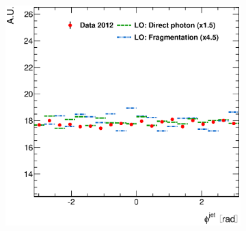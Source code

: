 \documentclass[12pt, twoside]{article}
\numberwithin{equation}{section}
\numberwithin{figure}{section}
\newenvironment{changemargin}[2]{%
\begin{list}{}{%
\setlength{\topsep}{0pt}%
\setlength{\leftmargin}{#1}%
\setlength{\rightmargin}{#2}%
\setlength{\listparindent}{\parindent}%
\setlength{\itemindent}{\parindent}%
\setlength{\parsep}{\parskip}%
}%
\item[]}{\end{list}}
\begin{document}
\begin{figure}
\begin{changemargin}{-1.0cm}{-0.75cm}
\begin{changemargin}{-0.75cm}{-1.0cm}
\begin{subfigure}[b]{0.37\textwidth}
            \subcaption{}
            \label{fig:DiffCrossSectDPFPRapidityJet}
        \end{subfigure}
        \begin{subfigure}[b]{0.37\textwidth}
            \includegraphics[width=\textwidth]{./images/DifferentialCrossSectionsDPFP/NORM_DIFF_CRSS_SEC-106.eps}
            \subcaption{}
            \label{fig:DiffCrossSectDPFPPhiJet}
        \end{subfigure}


\end{changemargin}
\end{changemargin}
\end{figure}
\end{document}
